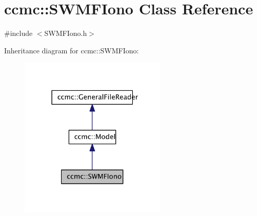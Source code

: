 \hypertarget{classccmc_1_1_s_w_m_f_iono}{\section{ccmc\-:\-:S\-W\-M\-F\-Iono Class Reference}
\label{classccmc_1_1_s_w_m_f_iono}
}


{\ttfamily \#include $<$S\-W\-M\-F\-Iono.\-h$>$}



Inheritance diagram for ccmc\-:\-:S\-W\-M\-F\-Iono\-:\nopagebreak
\begin{figure}[H]
\begin{center}
\leavevmode
\includegraphics[width=198pt]{classccmc_1_1_s_w_m_f_iono__inherit__graph}
\end{center}
\end{figure}


